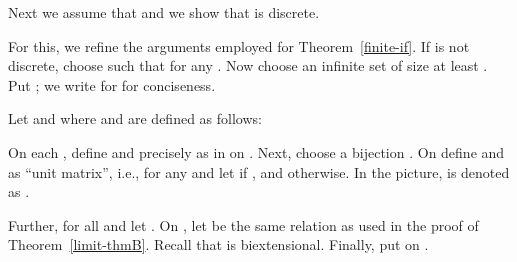 \documentclass{LMCS}
\begin{document}
Next we assume that    and we show that  is 
discrete.

 For this, we refine the arguments employed for
Theorem~\ref{finite-if}. If  is not discrete,
choose  such that  for any .
Now choose an infinite set  of size at least .  Put ; we write  for  for conciseness.

Let   and  where  and   are defined as follows:


On each  , define  and  precisely as
 in  on . Next, choose a bijection . On  define 
and  as ``unit matrix'', i.e.,  for any 
and  let  if , and
 otherwise. In the picture,  is denoted as . 

Further, for all  and  let . On , let  be the same
relation as used in the proof of Theorem~\ref{limit-thmB}. Recall that
 is biextensional. Finally, put  on . 
\end{document}
